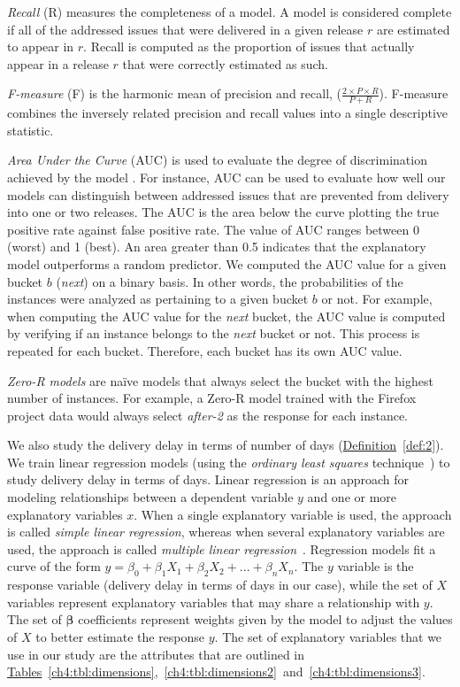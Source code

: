 \textit{Recall} (R) measures the completeness of a model. A model is considered
complete if all of the addressed issues that were delivered in a given release
\(r\) are estimated to appear in \(r\).  Recall is computed as the proportion of
issues that actually appear in a release \(r\) that were correctly estimated as
such.

\textit{F-measure} (F) is the harmonic mean of precision and recall, (\ie $\frac
{2 \times P \times R}{P + R}$). F-measure combines the inversely related
precision and recall values into a single descriptive statistic. 

\textit{Area Under the Curve} (AUC) is used to evaluate the degree of
discrimination achieved by the model \cite{hanley1982meaning}. For instance, AUC
can be used to evaluate how well our models can distinguish between addressed issues
that are prevented from delivery into one or two releases. The AUC is the
area below the curve plotting the true positive rate against false positive
rate. The value of AUC ranges between 0 (worst) and 1 (best). An area greater
than 0.5 indicates that the explanatory model outperforms a random predictor. We
computed the AUC value for a given bucket \(b\) (\eg \textit{next}) on a binary
basis. In other words, the probabilities of the instances were analyzed as
pertaining to a given bucket \(b\) or not. For example, when computing the AUC
value for the \textit{next} bucket, the AUC value is computed by verifying if an
instance belongs to the \textit{next} bucket or not. This process is repeated
for each bucket. Therefore, each bucket has its own AUC value.  

\textit{Zero-R models} are na\"{i}ve models that always select the bucket with
the highest number of instances. For example, a Zero-R model trained with the
Firefox project data would always select \textit{after-2} as the response for
each instance. 

We also study the delivery delay in terms of number of days
(\hyperref[def:2]{Definition}~\ref{def:2}). We train linear regression models
(using the \textit{ordinary least squares} technique~\cite{springertexts}) to
study delivery delay in terms of days. Linear regression is an approach for
modeling relationships between a dependent variable $y$ and one or more
explanatory variables $x$. When a single explanatory variable is used, the
approach is called {\em simple linear regression}, whereas when several
explanatory variables are used, the approach is called {\em multiple linear
regression}~\cite{freedman2009statistical}.  Regression models fit a curve of
the form $y = \beta_0 + \beta_{1}X_1 + \beta_{2}X_2 + ... + \beta_{n}X_n$. The
$y$ variable is the response variable (\ie delivery delay in terms of days in
our case), while the set of ${X}$ variables represent explanatory variables that
may share a relationship with $y$. The set of $\boldsymbol{\beta}$ coefficients
represent weights given by the model to adjust the values of $X$ to better
estimate the response $y$. The set of explanatory variables that we use in our
study are the attributes that are outlined in
\hyperref[ch4:tbl:dimensions]{Tables}~\ref{ch4:tbl:dimensions},~\ref{ch4:tbl:dimensions2}~and~\ref{ch4:tbl:dimensions3}.  

